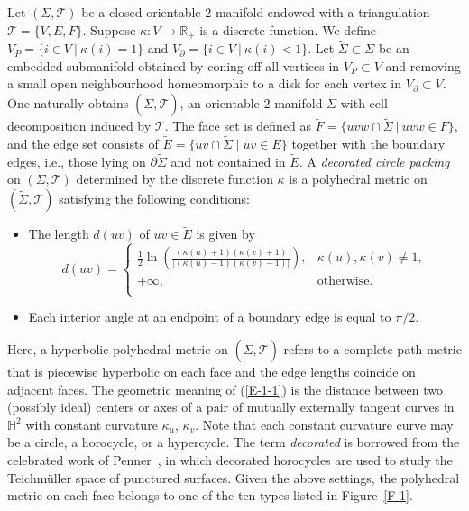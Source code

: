 \documentclass[11pt,leqno]{article}
\numberwithin{equation}{section}
\theoremstyle{definition}
\begin{document}
Let $(\Sigma,\mathcal T)$ be a closed orientable $2$-manifold endowed with a triangulation $\mathcal{T}=\{V, E, F\}$.
Suppose $\kappa:V\to\mathbb{R}_+$ is a discrete function. We define
$V_P=\{i\in V\ |\ \kappa(i)=1\}$ and $V_\partial=\{i\in V\ |\ \kappa(i)<1\}.$
Let $\widetilde\Sigma \subset\Sigma$ be an embedded submanifold obtained by coning off all vertices in $V_P \subset V$ and removing a small open neighbourhood homeomorphic to a disk for each vertex in $V_\partial \subset V$.
One naturally obtains $(\widetilde\Sigma,\mathcal T)$, an orientable $2$-manifold $\widetilde\Sigma$ with cell decomposition induced by \(\mathcal{T}\). The face set is defined as $\widetilde F=\{uvw\cap\widetilde\Sigma\ |\ uvw\in F\}$,
and the edge set consists of $\widetilde E = \{uv \cap \widetilde\Sigma \mid uv \in E\}$ together with the boundary edges, i.e., those lying on $\partial \widetilde \Sigma$ and not contained in $\widetilde E$.
A \emph{decorated circle packing} on $(\Sigma,\mathcal T)$ determined by the discrete function $\kappa$ is a polyhedral metric on $(\widetilde\Sigma,\mathcal T)$ satisfying the following conditions:
\begin{itemize}
\item[$\textbf{(C1)}$] The length  $d(uv)$ of $uv\in\widetilde E$  is given by
\begin{equation}\label{E-1-1}
d(uv) =
\begin{cases}
\displaystyle \frac{1}{2} \ln\left( \frac{(\kappa(u) + 1)(\kappa(v) + 1)}{\left|(\kappa(u) - 1)(\kappa(v) - 1)\right|} \right), &   \kappa(u), \kappa(v) \neq 1, \\
+\infty, & \text{otherwise}.\\
\end{cases}
\end{equation}
\item[$\textbf{(C2)}$] Each interior angle at an endpoint of a boundary edge is equal to $\pi/2$.
\end{itemize}
Here, a hyperbolic polyhedral metric on  $(\widetilde\Sigma,\mathcal T)$ refers to a complete path metric that is piecewise hyperbolic on each face and the edge lengths coincide on adjacent faces.
The geometric meaning of (\ref{E-1-1}) is the distance between two (possibly ideal) centers or axes of a pair of mutually externally tangent curves in $\mathbb{H}^2$ with constant curvature $\kappa_u$, $\kappa_v$. Note that each constant curvature curve may be a circle, a horocycle, or a hypercycle.
The term \emph{decorated} is borrowed from the celebrated work of Penner~\cite{MR919235}, in which decorated horocycles are used to study the Teichm\"uller space of punctured surfaces.
Given the above settings, the polyhedral metric on each face belongs to one of the ten types listed in Figure~\ref{F-1}.
\end{document}
